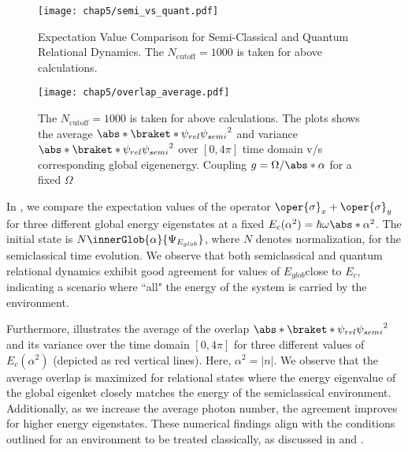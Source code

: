 \begin{figure}[!h]
        \label{fig:chap5_JCM_semi_vs_quant}
        \centering
        \texttt{[image: chap5/semi\_vs\_quant.pdf]}
        \caption[Expectation Value Comparison for Semi-Classical and
         Quantum Relational Dynamics]{Expectation Value Comparison 
         for Semi-Classical and Quantum Relational Dynamics. The $N_{\mathrm{cutoff}}=1000$ is taken for above calculations.}
\end{figure}
\begin{figure}[!h]
        \label{fig:chap5_JCM_overlap_avg}
        \centering
        \texttt{[image: chap5/overlap\_average.pdf]}
        \caption[Average $\abs*{\braket*{\psi_{rel}}{\psi_{semi}}}^2$ 
        (\& variance $\abs*{\braket*{\psi_{rel}}{\psi_{semi}}}^2$)
         v/s Global Eigen Energy]{The $N_{\mathrm{cutoff}}=1000$ is taken for above calculations.
         The plots shows the average $\abs*{\braket*{\psi_{rel}}{\psi_{semi}}}^2$ and 
         variance $\abs*{\braket*{\psi_{rel}}{\psi_{semi}}}^2$ over \([0, 4\pi]\) time domain 
         v/s corresponding global eigenenergy.
         Coupling \(g = \Omega / \abs*{\alpha}\) for a fixed \(\Omega\)}
\end{figure}

In , we compare the expectation values of the operator 
\(\oper{\sigma}_x + \oper{\sigma}_y\)  for three different global energy eigenstates at a fixed 
\(E_c(\alpha^2) = \hbar \omega \abs*{\alpha}^2\). The initial state is \(N\innerGlob{\alpha}{\Psi_{E_{glob}}}\), where $N$ denotes normalization, 
for the semiclassical time evolution. We observe that both semiclassical and quantum relational dynamics exhibit 
good agreement for values of $E_{glob}$​ close to $E_c$​, indicating a scenario where ``all" the energy of the system 
is carried by the environment.

Furthermore,  illustrates the average of the overlap 
\(\abs*{\braket*{\psi_{rel}}{\psi_{semi}}}^2\) 
 and its variance over the time domain 
 \([0, 4\pi]\) for three different values of $E_c(\alpha^2)$ (depicted as red vertical lines). 
Here, \(\alpha^2 = \lvert n \rvert\). We observe that the average overlap is maximized for relational states 
where the energy eigenvalue of the global eigenket closely matches the energy of the semiclassical 
environment. Additionally, as we increase the average photon number, the agreement improves for 
higher energy eigenstates. These numerical findings align with the conditions outlined for an 
environment to be treated classically, as discussed in  and 
.


